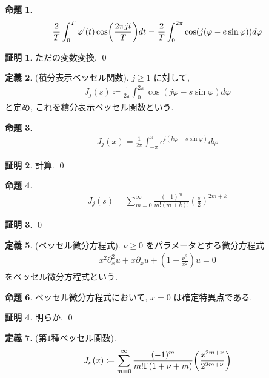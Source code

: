\documentclass[10pt, fleqn, label-section=none]{bxjsarticle}
\theoremstyle{definition}
\newtheorem{dfn}{定義}[section]
\newtheorem{prop}[dfn]{命題}
\newtheorem*{pf*}{証明}
\newcommand{\paren}[1]{\mleft( #1\mright )}
\renewcommand{\;}{\, ; \,}
\begin{document}
\begin{prop}
\begin{align*} \frac{2}{T} \int_{0}^T \varphi^\prime (t) \cos\paren{\frac{2 \pi j t }{ T} } dt = \frac{2}{T} \int_0 ^ {2\pi} \cos (j(\varphi - e \sin \varphi)) d\varphi  \end{align*}
\end{prop}
\begin{pf*}
ただの変数変換. 
\qed
\end{pf*}

\begin{dfn}(積分表示ベッセル関数). $j \geq 1$ に対して,  
\begin{align*} J_j (s) \coloneqq \frac{1}{2\pi} \int_0^{2\pi} \cos(j \varphi - s \sin \varphi) d \varphi \end{align*}
と定め, これを積分表示ベッセル関数という.
\end{dfn}

\begin{prop}
\begin{align*} J_j(x) = \frac{1}{2\pi} \int_{-\pi}^{\pi} e^{i(k \varphi - s \sin \varphi )} d\varphi  \end{align*}
\end{prop}
\begin{pf*}
計算. 
\qed
\end{pf*}

\begin{prop}
\begin{align*} J_j (s) = \sum_{m = 0} ^ \infty \frac{(-1)^m}{m! (m + k) !} (\frac{s}{2})^{2m + k}  \end{align*}
\end{prop}
\begin{pf*}

\qed
\end{pf*}

\begin{dfn}(ベッセル微分方程式). $\nu \geq 0$ をパラメータとする微分方程式
\begin{align*} x^2 \partial_x ^2 u  + x \partial_x u +  ( 1 - \frac{\nu^2}{x^2}  ) u  = 0   \end{align*}
をベッセル微分方程式という. 
\end{dfn}

\begin{prop}
ベッセル微分方程式において, $x = 0$ は確定特異点である.  
\end{prop}
\begin{pf*}
明らか. 
\qed
\end{pf*}


\begin{dfn}(第$1$種ベッセル関数). 
\begin{align*} J_\nu(x) \coloneqq \sum_{m = 0}^\infty \frac{(-1)^m}{m! \Gamma(1 + \nu + m)} \paren{\frac{x^{2m + \nu}}{2^{2m + \nu}} }  \end{align*}
\end{dfn}
\end{document}
